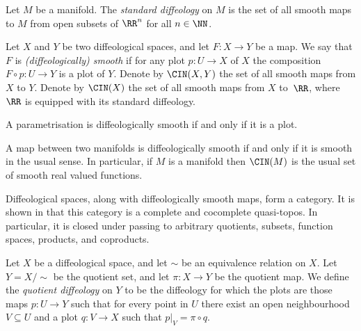 \begin{Example}
Let $M$ be a manifold. The \emph{standard diffeology} on $M$ is the
set of all smooth maps to $M$ from open subsets of $\RR^n$
for all $n \in \NN$.
\end{Example}

\begin{Definition}
Let $X$ and $Y$ be two dif\/feological spaces,
and let $F \colon X\to Y$ be a map. We say that $F$ is
\emph{(diffeologically) smooth} if for any plot $p \colon U \to X$ of $X$
the composition $ F \circ p \colon U \to Y$ is a plot of $Y$.
Denote by $\CIN(X,Y)$ the set of all smooth maps
from $X$ to $Y$.
Denote by $\CIN(X)$ the set of all smooth maps from $X$ to~$\RR$,
where $\RR$ is equipped with its standard dif\/feology.
\end{Definition}

\begin{Remark}[plots]
A parametrisation is dif\/feologically smooth if and only if it is a plot.
\end{Remark}

\begin{Remark}
A map between two manifolds is dif\/feologically smooth
if and only if it is smooth in the usual sense.
In particular, if $M$ is a manifold then $\CIN(M)$ is the usual set
of smooth real valued functions.
\end{Remark}

\begin{Remark}
Dif\/feological spaces, along with dif\/feologically smooth maps,
form a category. It is shown in \cite[Theorem~3.2]{BH} that this category
is a complete and cocomplete quasi-topos.
In particular, it is closed under passing to arbitrary quotients,
subsets, function spaces, products, and coproducts.
\end{Remark}

\begin{Definition}
Let $X$ be a dif\/feological space,
and let $\sim$ be an equivalence relation on $X$.
Let $Y = X/\!\!\sim$ be the quotient set,
and let $\pi \colon X\to Y$ be the quotient map.
We def\/ine the \emph{quotient diffeology} on $Y$
to be the dif\/feology for which the plots are those maps $p \colon U\to Y$
such that for every point in $U$
there exist an open neighbourhood $V \subseteq U$
and a plot $q \colon V\to X$ such that $p|_V = \pi \circ q$.
\end{Definition}

